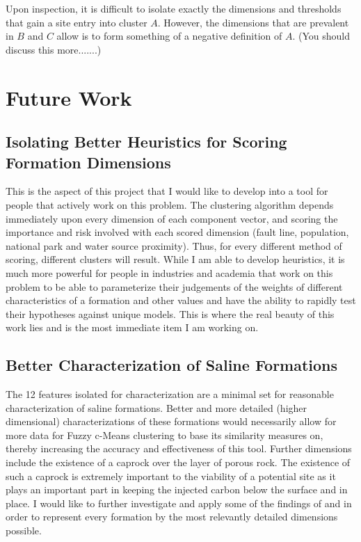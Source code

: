 \documentclass[letterpaper, 12pt]{article}
\begin{document}
\par Upon inspection, it is difficult to isolate exactly the dimensions and thresholds that gain a site entry into cluster $A$. However, the dimensions that are prevalent in $B$ and $C$ allow is to form something of a negative definition of $A$. 
(You should discuss this more.......)

\section{Future Work}
\subsection{Isolating Better Heuristics for Scoring Formation Dimensions}
This is the aspect of this project that I would like to develop into a tool for people that actively work on this problem. The clustering algorithm depends immediately upon every dimension of each component vector, and scoring the importance and risk involved with each scored dimension (fault line, population, national park and water source proximity). Thus, for every different method of scoring, different clusters will result. While I am able to develop heuristics, it is much more powerful for people in industries and academia that work on this problem to be able to parameterize their judgements of the weights of different characteristics of a formation and other values and have the ability to rapidly test their hypotheses against unique models. This is where the real beauty of this work lies and is the most immediate item I am working on. 

\subsection{Better Characterization of Saline Formations}\label{betterchar}
The 12 features isolated for characterization are a minimal set for reasonable characterization of saline formations. Better and more detailed (higher dimensional) characterizations of these formations would necessarily allow for more data for Fuzzy c-Means clustering to base its similarity measures on, thereby increasing the accuracy and effectiveness of this tool. Further dimensions include the existence of a caprock over the layer of porous rock. The existence of such a caprock is extremely important to the viability of a potential site as it plays an important part in keeping the injected carbon below the surface and in place. I would like to further investigate and apply some of the findings of \cite{natcarb_risk} and \cite{PredRisk2013} in order to represent every formation by the most relevantly detailed dimensions possible. 
\end{document}
